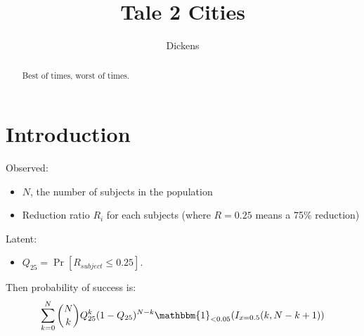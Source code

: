 \documentclass[12pt]{article}
\begin{document}
\title{Tale 2 Cities}
\author{Dickens}
\maketitle


\begin{abstract}
Best of times, worst of times.
\end{abstract}




%



\section{Introduction}

Observed: 
\begin{itemize}
\item $N$, the number of subjects in the population
\item Reduction ratio $R_i$ for each subjects (where $R=0.25$ means a 75\% reduction)
\end{itemize}
Latent:
\begin{itemize}
\item $Q_{25} = \Pr[R_{subject}\leq 0.25]$.
\end{itemize}
Then probability of success is:
$$\sum_{k=0}^N \binom{N}{k} Q_{25}^k (1-Q_{25})^{N-k} \mathbbm{1}_{<0.05}(I_{x=0.5}(k, N-k+1))$$
\end{document}
